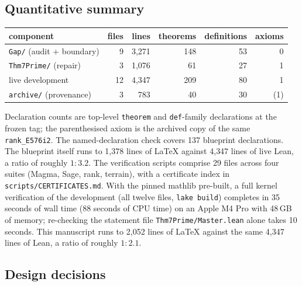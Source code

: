\documentclass[11pt]{amsart}
\begin{document}
\subsection{Quantitative summary}\label{sec:formal:quant}

\begin{center}
\small
\begin{tabular}{@{}lrrrrr@{}}
\toprule
component & files & lines & theorems & definitions & axioms \\
\midrule
\texttt{Gap/} (audit + boundary) & 9 & 3{,}271 & 148 & 53 & 0 \\
\texttt{Thm7Prime/} (repair) & 3 & 1{,}076 & 61 & 27 & 1 \\
\midrule
live development & 12 & 4{,}347 & 209 & 80 & 1 \\
\texttt{archive/} (provenance) & 3 & 783 & 40 & 30 & (1) \\
\bottomrule
\end{tabular}
\end{center}

\noindent Declaration counts are top-level \texttt{theorem} and
\texttt{def}-family declarations at the frozen tag; the parenthesised
axiom is the archived copy of the same \texttt{rank\_E576i2}.  The
named-declaration check covers 137 blueprint declarations.  The
blueprint itself runs to 1{,}378 lines of \LaTeX{} against 4{,}347
lines of live Lean, a ratio of roughly $1:3.2$.  The verification
scripts comprise 29 files across four suites (Magma, Sage, rank,
terrain), with a certificate index in
\texttt{scripts/CERTIFICATES.md}.
With the pinned mathlib pre-built, a full kernel verification of the
development (all twelve files, \texttt{lake build}) completes in 35
seconds of wall time (88 seconds of CPU time) on an Apple M4 Pro with
48\,GB of memory; re-checking the statement file
\texttt{Thm7Prime/Master.lean} alone takes 10 seconds.  This manuscript
runs to 2{,}052 lines of \LaTeX{} against the same 4{,}347 lines of Lean,
a ratio of roughly $1:2.1$.

\subsection{Design decisions}\label{sec:formal:design}
\end{document}
